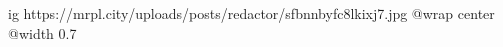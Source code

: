  
 
 
 
 

\ifcmt
  ig https://mrpl.city/uploads/posts/redactor/sfbnnbyfc8lkixj7.jpg
  @wrap center
  @width 0.7
\fi

